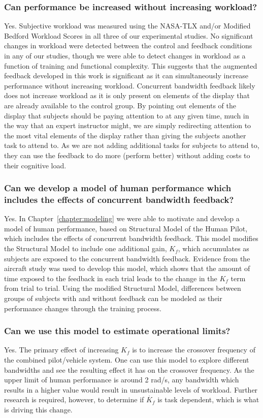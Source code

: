 \subsubsection{Can performance be increased without increasing workload?}
Yes.
Subjective workload was measured using the NASA-TLX and/or Modified Bedford Workload Scores in all three of our experimental studies.
No significant changes in workload were detected between the control and feedback conditions in any of our studies, though we were able to detect changes in workload as a function of training and functional complexity.
This suggests that the augmented feedback developed in this work is significant as it can simultaneously increase performance without increasing workload.
Concurrent bandwidth feedback likely does not increase workload as it is only present on elements of the display that are already available to the control group.
By pointing out elements of the display that subjects should be paying attention to at any given time, much in the way that an expert instructor might, we are simply redirecting attention to the most vital elements of the display rather than giving the subjects another task to attend to.
As we are not adding additional tasks for subjects to attend to, they can use the feedback to do more (perform better) without adding costs to their cognitive load.

\subsubsection{Can we develop a model of human performance which includes the effects of concurrent bandwidth feedback?}
Yes.
In Chapter~\ref{chapter:modeling} we were able to motivate and develop a model of human performance, based on Structural Model of the Human Pilot, which includes the effects of concurrent bandwidth feedback.
This model modifies the Structural Model to include one additional gain, $K_f$, which accumulates as subjects are exposed to the concurrent bandwidth feedback.
Evidence from the aircraft study was used to develop this model, which shows that the amount of time exposed to the feedback in each trial leads to the change in the $K_f$ term from trial to trial.
Using the modified Structural Model, differences between groups of subjects with and without feedback can be modeled as their performance changes through the training process.

\subsubsection{Can we use this model to estimate operational limits?}
Yes.
The primary effect of increasing $K_f$ is to increase the crossover frequency of the combined pilot/vehicle system.
One can use this model to explore different bandwidths and see the resulting effect it has on the crossover frequency.
As the upper limit of human performance is around 2 rad/s, any bandwidth which results in a higher value would result in unsustainable levels of workload.
Further research is required, however, to determine if $\dot{K_f}$ is task dependent, which is what is driving this change.

